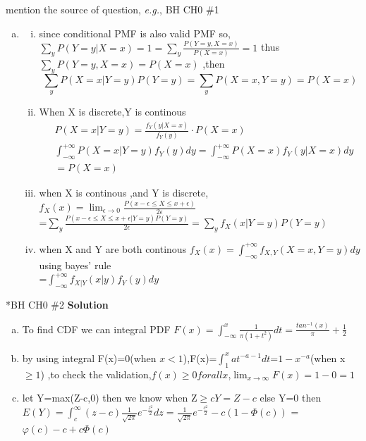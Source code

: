 \documentclass{article}
\newcommand{\solution}{\textbf{\Large Solution}}
\begin{document}
\begin{homeworkProblem}{{\color{blue}mention the source of question}, \textit{e.g.}, BH CH0 \#1}
\begin{enumerate}[(a)]
\begin{enumerate}[(i)]
\end{enumerate}
\newpage
\item \begin{enumerate}[(i)]
\item since conditional PMF is also valid PMF  so,$\sum_{y}P(Y=y|X=x)=1=\sum_{y}\frac{P(Y=y,X=x)}{P(X=x)}=1$ thus $\sum_{y}P(Y=y,X=x)=P(X=x)$ ,then $$\sum_{y}P(X=x|Y=y)P(Y=y)=\sum_{y}P(X=x,Y=y)=P(X=x)$$
\item When X is discrete,Y is continous
\begin{equation}
	\begin{aligned}
& P(X=x|Y=y)=\frac{f_Y(y|X=x)}{f_Y(y)}\cdot P(X=x)
\\& \int_{-\infty}^{+\infty}P(X=x|Y=y)f_Y(y)dy=\int_{-\infty}^{+\infty}P(X=x)f_Y(y|X=x)dy
\\& =P(X=x)
	\end{aligned}
\end{equation}
\item when X is continous ,and Y is discrete, $f_X(x)=\lim_{\epsilon\to 0}\frac{P(x-\epsilon\leq X\leq x+\epsilon)}{2\epsilon}$\\
=$\sum_{y}\frac{P(x-\epsilon\leq X\leq x+\epsilon|Y=y)P(Y=y)}{2\epsilon}=\sum_{y} f_{X}(x|Y=y)P(Y=y)$
\item when X and Y are both continous $f_{X}(x)=\int _{-\infty}^{+\infty}f_{X,Y}(X=x,Y=y)dy$ using bayes' rule
\\=$\int _{-\infty}^{+\infty}f_{X|Y}(x|y)f_{Y}(y)dy$ 
	\end{enumerate}
\end{enumerate}
\end{homeworkProblem}

\begin{homeworkProblem}*{BH CH0 \#2}
\solution\\
\begin{enumerate}[(a)]
	\item To find CDF we can integral PDF $F(x)=\int _{-\infty}^{x}\frac{1}{\pi(1+t^2)}dt
	=\frac{tan^{-1}(x)}{\pi}+\frac{1}{2}$
	\item by using integral F(x)=0(when $x<1$),F(x)=$\int_{1}^{x}at^{-a-1}dt$=$1-x^{-a}$(when x$\geq 1$) ,to check the validation,$f(x)\geq 0 for all x$,$\lim_{x\to \infty}F(x)=1-0=1$
	\item let Y=max(Z-c,0) then we know when Z$\geq c Y=Z-c$ else Y=0 then $E(Y)=\int_{c}^{\infty}(z-c)\frac{1}{\sqrt{2\pi}}e^{-\frac{z^2}{2}}dz=\frac{1}{\sqrt{2\pi}}e^{-\frac{c^2}{2}}-c(1-\Phi(c))$ 
=$\varphi(c)-c+c\Phi(c)$
\end{enumerate}



\end{homeworkProblem}
\end{document}
